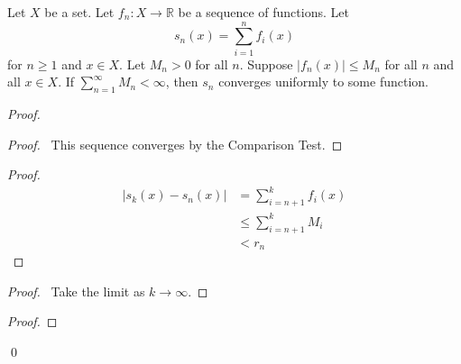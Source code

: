 \begin{prop}
  Let $X$ be a set. Let $f_n : X \rightarrow \mathbb{R}$ be a sequence of functions. Let
  \[ s_n(x) = \sum_{i=1}^n f_i(x) \]
  for $n \geq 1$ and $x \in X$. Let $M_n > 0$ for all $n$. Suppose $|f_n(x)| \leq M_n$ for all $n$ and all $x \in X$.
  If $\sum_{n=1}^\infty M_n < \infty$, then $s_n$ converges uniformly to some function.
\end{prop}

\begin{proof}
  \pf
  \begin{proof}
    \pf\ This sequence converges by the Comparison Test.
  \end{proof}
  \begin{proof}
    \pf
    \begin{align*}
      |s_k(x) - s_n(x)| & = \sum_{i=n+1}^k f_i(x) \\
      & \leq \sum_{i=n+1}^k M_i \\
      & < r_n
    \end{align*}
  \end{proof}
  \begin{proof}
    \pf\ Take the limit as $k \rightarrow \infty$.
  \end{proof}
  \begin{proof}
  \end{proof}
  \qed
\end{proof}
